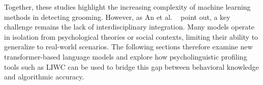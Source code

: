 Together, these studies highlight the increasing complexity of machine learning methods in detecting grooming. However, as An et al. \ \parencite{an2025cybergrooming} point out, a key challenge remains the lack of interdisciplinary integration. Many models operate in isolation from psychological theories or social contexts, limiting their ability to generalize to real-world scenarios. The following sections therefore examine new transformer-based language models and explore how psycholinguistic profiling tools such as LIWC can be used to bridge this gap between behavioral knowledge and algorithmic accuracy.


\begin{comment}


\subsection{Remaining Challenges in automated Cybergrooming Detection}

\subsection{Remaining Challenges in Cybergrooming Detection}

Despite notable advances, the automated detection of online grooming remains a complex task. Challenges include the informal and fragmented nature of online chats, the gradual and manipulative structure of grooming conversations and the difficulty of identifying the predator in anonymized interactions \parencite{schlaepfer2022online, gupta2012characterizingpedophileconversationsinternet}. Moreover, the need to detect abusive intent early—while minimizing false positives—raises ethical concerns, particularly in high-stakes child protection contexts \parencite{vogt2021early}.

Addressing these challenges requires models that are both linguistically robust and contextually aware. In the following, recent Transformer-based language models are explored as a foundation for capturing the nuanced dynamics of grooming. Subsequently, the integration of psycholinguistic profiling through LIWC is examined as a means to enhance interpretability and behavioral insight in detection systems.


The automated detection of online grooming remains a highly complex and ethically sensitive task. Several linguistic, behavioral, and technical challenges hinder the development of accurate and timely detection systems. 


\end{comment}
